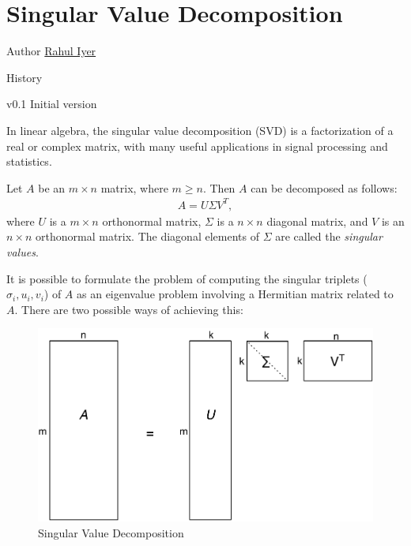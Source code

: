 
\chapter[Singular Value Decomposition]{Singular Value Decomposition}

\begin{moduleinfo}
\item[Author] \href{mailto:riyer@gopivotal.com}{Rahul Iyer}
\item[History]
    \begin{modulehistory}
        \item[v0.1] Initial version
    \end{modulehistory}
\end{moduleinfo}

\newcommand{\vectornorm}[1]{\left|\left|#1\right|\right|}
\def\Rset{\mathbb{R}}
In linear algebra, the singular value decomposition (SVD) is a factorization of
a real or complex matrix, with many useful applications in signal processing and
statistics.

Let $A$ be an $m \times n$ matrix, where $m \ge n$. Then $A$ can be decomposed as follows:
\begin{gather*}
    A = U \Sigma V^T,
\end{gather*}
where $U$ is a $m \times n$ orthonormal matrix, $\Sigma$ is a $n\times n$
diagonal matrix, and $V$ is an $n\times n$ orthonormal matrix. The diagonal
elements of $\Sigma$ are called the \emph{singular values}.

It is possible to formulate the problem of computing the singular triplets
($\sigma_i, u_i, v_i$) of $A$ as an eigenvalue problem involving a Hermitian
matrix related to $A$. There are two possible ways of achieving this:

\begin{figure}[tb]
    \begin{center}
        \includegraphics[width=\textwidth]{figures/svd_figure}
    \end{center}
    \caption{Singular Value Decomposition}
    \label{fig:svd}
\end{figure}

